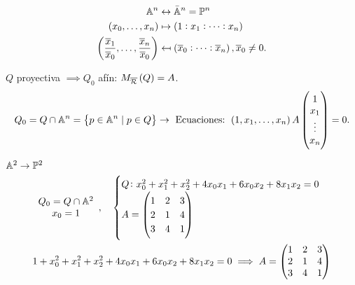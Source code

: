 \begin{align*}
    \mathbb{A}^n &\leftrightarrow \bar{\mathbb{A}}^n = \mathbb{P}^n \\
    \left( x_0, \dots, x_n \right) &\mapsto \left( 1:x_1:\dots:x_n \right) \\
    \left( \frac{\overline{x}_1}{\overline{x}_0}, \dots, \frac{\overline{x}_n}{\overline{x}_0} \right) &\mapsfrom \left( \overline{x}_0:\dots:\overline{x}_n \right), \overline{x}_0 \neq 0.
\end{align*}
\begin{obs}
    $Q$ proyectiva $\implies Q_0$ afín: $M_{\overline{\mathcal{R}}}\left( Q \right) = A$.
    \[ Q_0 = Q\cap \mathbb{A}^n = \left\{ p \in \mathbb{A}^n \;|\; p\in Q \right\} \to \text{ Ecuaciones: } \left( 1,x_1,\dots,x_n \right)A
       \begin{pmatrix}
            1 \\
            x_1 \\
            \vdots \\
            x_n
        \end{pmatrix} = 0.
    \]
\end{obs}
\begin{example}
    $\mathbb{A}^2 \to \mathbb{P}^2$ \\
    \begin{gather*}
        \begin{array}{c}
            Q_0 = Q\cap \mathbb{A}^2 \\
            x_0 = 1
        \end{array}, \quad
        \begin{cases}
            Q \colon x_0^2 + x_1^2 + x_2^2 + 4x_0x_1 + 6x_0x_2 + 8x_1x_2 = 0 \\
            A = 
            \begin{pmatrix}
                1 & 2 & 3 \\
                2 & 1 & 4 \\
                3 & 4 & 1
            \end{pmatrix}
        \end{cases} \\
        1 + x_0^2 + x_1^2 + x_2^2 + 4x_0x_1 + 6x_0x_2 + 8x_1x_2 = 0 \implies A = 
        \begin{pmatrix}
            1 & 2 & 3 \\
            2 & 1 & 4 \\
            3 & 4 & 1
        \end{pmatrix}
    \end{gather*}
\end{example}
